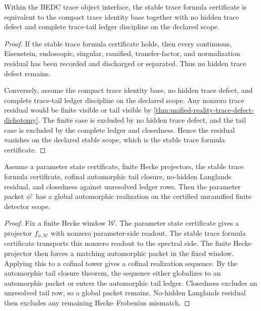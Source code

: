 \begin{theorem}
\label{thm:unified-reality-stable-trace-formula-no-hidden-defect}
Within the BEDC trace object interface, the stable trace formula
certificate is equivalent to the compact trace identity base together
with no hidden trace defect and complete trace-tail ledger discipline on
the declared scope.
\end{theorem}
\begin{proof}
If the stable trace formula certificate holds, then every continuous,
Eisenstein, endoscopic, singular, ramified, transfer-factor, and
normalization residual has been recorded and discharged or separated.
Thus no hidden trace defect remains.

Conversely, assume the compact trace identity base, no hidden trace
defect, and complete trace-tail ledger discipline on the declared scope.
Any nonzero trace residual would be finite visible or tail visible by
\autoref{thm:unified-reality-trace-defect-dichotomy}. The finite case is
excluded by no hidden trace defect, and the tail case is excluded by the
complete ledger and closedness. Hence the residual vanishes on the
declared stable scope, which is the stable trace formula certificate.
\end{proof}

\begin{theorem}
\label{thm:unified-reality-trace-closure-implies-langlands-existence}
Assume a parameter state certificate, finite Hecke projectors, the stable
trace formula certificate, cofinal automorphic tail closure, no-hidden
Langlands residual, and closedness against unresolved ledger rows. Then
the parameter packet $\phi^{\uparrow}$ has a global automorphic
realization on the certified unramified finite detector scope.
\end{theorem}
\begin{proof}
Fix a finite Hecke window $\mathcal W$. The parameter state certificate
gives a projector $f_{\phi,\mathcal W}$ with nonzero parameter-side
readout. The stable trace formula certificate transports this nonzero
readout to the spectral side. The finite Hecke projector then forces a
matching automorphic packet in the fixed window. Applying this to a
cofinal tower gives a cofinal realization sequence. By the automorphic
tail closure theorem, the sequence either globalizes to an automorphic
packet or enters the automorphic tail ledger. Closedness excludes an
unresolved tail row, so a global packet remains. No-hidden Langlands
residual then excludes any remaining Hecke--Frobenius mismatch.
\end{proof}

